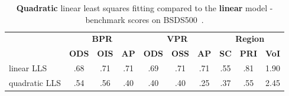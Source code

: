 \begin{table}[htbp]
\renewcommand{\arraystretch}{1.3}
\centering
\scriptsize
\begin{tabular}{l|c|c|c||c|c|c||c|c|c|}
\cline{2-10} %
\multirow{2}{*}{} & \multicolumn{3}{c||}{\textbf{BPR}} & \multicolumn{3}{c||}{\textbf{VPR}}& \multicolumn{3}{c|}{\textbf{Region}}\\
\cline{2-10}
& \textbf{ODS}  & \textbf{OIS} & \textbf{AP} %
& \textbf{ODS} & \textbf{OSS} & \textbf{AP} %
& \textbf{SC} & \textbf{PRI} & \textbf{VoI} \\
\hline
\multicolumn{1}{|l|}{linear LLS} & .68 & .71 & .71 & .69 & .71 & .71 & .55 & .81 & 1.90 \\%
\hline
\multicolumn{1}{|l|}{quadratic LLS} & .54 & .56 & .40 & .40 & .40 & .25 & .37 & .55 & 2.45 \\
\hline
\end{tabular}
\caption[{\bf Quadratic} linear least squares fitting compared to the {\bf linear} model - table]{{\bf Quadratic} linear least squares fitting compared to the {\bf linear} model - benchmark scores on BSDS500~\cite{BSDS500resources}.}
\label{tab:quadratic-lls-fitting}
\end{table}

